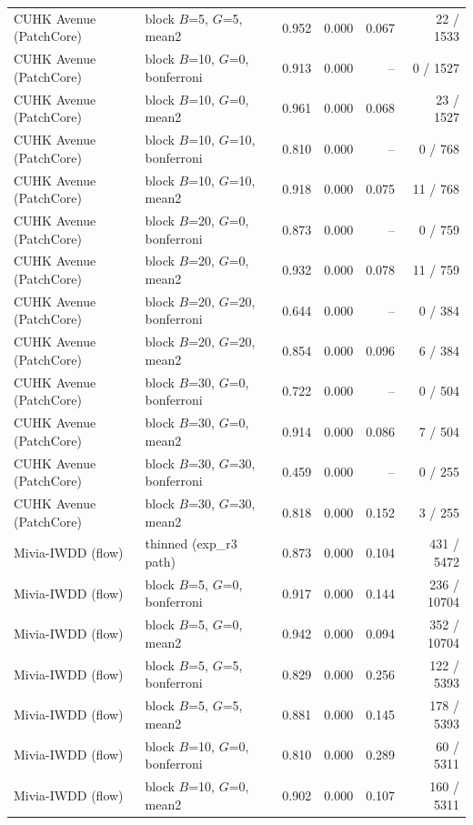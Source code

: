 \begin{table}[t]
{\begin{tabular}{llrrrr}
CUHK Avenue (PatchCore) & block $B$=5, $G$=5, mean2 & 0.952 & 0.000 & 0.067 & 22 / 1533 \\
CUHK Avenue (PatchCore) & block $B$=10, $G$=0, bonferroni & 0.913 & 0.000 & -- & 0 / 1527 \\
CUHK Avenue (PatchCore) & block $B$=10, $G$=0, mean2 & 0.961 & 0.000 & 0.068 & 23 / 1527 \\
CUHK Avenue (PatchCore) & block $B$=10, $G$=10, bonferroni & 0.810 & 0.000 & -- & 0 / 768 \\
CUHK Avenue (PatchCore) & block $B$=10, $G$=10, mean2 & 0.918 & 0.000 & 0.075 & 11 / 768 \\
CUHK Avenue (PatchCore) & block $B$=20, $G$=0, bonferroni & 0.873 & 0.000 & -- & 0 / 759 \\
CUHK Avenue (PatchCore) & block $B$=20, $G$=0, mean2 & 0.932 & 0.000 & 0.078 & 11 / 759 \\
CUHK Avenue (PatchCore) & block $B$=20, $G$=20, bonferroni & 0.644 & 0.000 & -- & 0 / 384 \\
CUHK Avenue (PatchCore) & block $B$=20, $G$=20, mean2 & 0.854 & 0.000 & 0.096 & 6 / 384 \\
CUHK Avenue (PatchCore) & block $B$=30, $G$=0, bonferroni & 0.722 & 0.000 & -- & 0 / 504 \\
CUHK Avenue (PatchCore) & block $B$=30, $G$=0, mean2 & 0.914 & 0.000 & 0.086 & 7 / 504 \\
CUHK Avenue (PatchCore) & block $B$=30, $G$=30, bonferroni & 0.459 & 0.000 & -- & 0 / 255 \\
CUHK Avenue (PatchCore) & block $B$=30, $G$=30, mean2 & 0.818 & 0.000 & 0.152 & 3 / 255 \\
Mivia-IWDD (flow) & thinned (exp_r3 path) & 0.873 & 0.000 & 0.104 & 431 / 5472 \\
Mivia-IWDD (flow) & block $B$=5, $G$=0, bonferroni & 0.917 & 0.000 & 0.144 & 236 / 10704 \\
Mivia-IWDD (flow) & block $B$=5, $G$=0, mean2 & 0.942 & 0.000 & 0.094 & 352 / 10704 \\
Mivia-IWDD (flow) & block $B$=5, $G$=5, bonferroni & 0.829 & 0.000 & 0.256 & 122 / 5393 \\
Mivia-IWDD (flow) & block $B$=5, $G$=5, mean2 & 0.881 & 0.000 & 0.145 & 178 / 5393 \\
Mivia-IWDD (flow) & block $B$=10, $G$=0, bonferroni & 0.810 & 0.000 & 0.289 & 60 / 5311 \\
Mivia-IWDD (flow) & block $B$=10, $G$=0, mean2 & 0.902 & 0.000 & 0.107 & 160 / 5311 \\

\end{tabular}}
\end{table}
